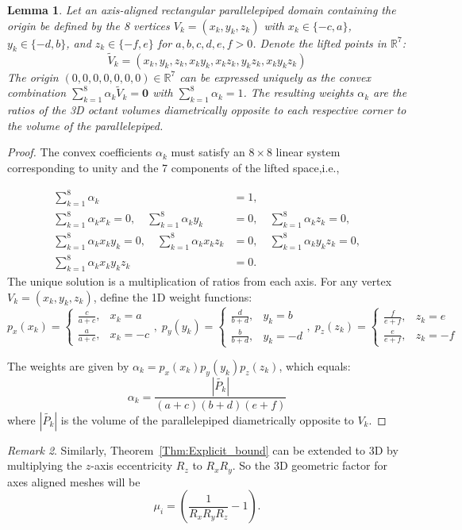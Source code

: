 \documentclass[a4paper]{article}
\theoremstyle{plain}
\newtheorem{lemma}{Lemma}
\theoremstyle{definition}
\theoremstyle{remark}
\newtheorem{remark}[lemma]{Remark}
\begin{document}
\begin{lemma}
	Let an axis-aligned rectangular parallelepiped domain containing the origin be defined by the 8 vertices $V_k = (x_k, y_k, z_k)$ with $x_k \in \{-c, a\}$, $y_k \in \{-d, b\}$, and $z_k \in \{-f, e\}$ for $a,b,c,d,e,f > 0$. Denote the lifted points in $\mathbb{R}^7$:$$\tilde{V}_k = (x_k, y_k, z_k, x_k y_k, x_k z_k, y_k z_k, x_k y_k z_k)$$The origin $(0,0,0,0,0,0,0)\in \mathbb{R}^7$ can be expressed uniquely as the convex combination $\sum_{k=1}^{8} \alpha_k \tilde{V}_k = \mathbf{0}$ with $\sum_{k=1}^{8} \alpha_k = 1$. The resulting weights $\alpha_k$ are the ratios of the 3D octant volumes diametrically opposite to each respective corner to the volume of the parallelepiped.
\end{lemma}

\begin{proof}The convex coefficients $\alpha_k$ must satisfy an $8 \times 8$ linear system corresponding to unity and the 7 components of the lifted space,i.e.,

	    \begin{align}
		\sum_{k=1}^{8} \alpha_k &= 1, \label{eq:unity3d} \\
		\sum_{k=1}^{8} \alpha_k x_k = 0, \quad \sum_{k=1}^{8} \alpha_k y_k &= 0, \quad \sum_{k=1}^{8} \alpha_k z_k = 0, \\
		\sum_{k=1}^{8} \alpha_k x_k y_k = 0, \quad \sum_{k=1}^{8} \alpha_k x_k z_k &= 0, \quad \sum_{k=1}^{8} \alpha_k y_k z_k = 0, \\
		\sum_{k=1}^{8} \alpha_k x_k y_k z_k &= 0.
		\end{align}
	The unique solution is a multiplication of ratios from each axis. For any vertex $V_k = (x_k, y_k, z_k)$, define the 1D weight functions:
	$$p_x(x_k) = \begin{cases} \frac{c}{a+c}, &  x_k = a \\ \frac{a}{a+c}, &  x_k = -c \end{cases}, \; p_y(y_k) = \begin{cases} \frac{d}{b+d}, & y_k = b \\ \frac{b}{b+d}, &  y_k = -d \end{cases},\; p_z(z_k) = \begin{cases} \frac{f}{e+f}, & z_k = e \\ \frac{e}{e+f}, &  z_k = -f \end{cases}$$
	
	The weights are given by $\alpha_k = p_x(x_k) p_y(y_k) p_z(z_k)$, which equals:
	$$\alpha_k = \frac{ |\tilde{P_k}| }{(a+c)(b+d)(e+f)}$$
	where $|\tilde{P_k}|$ is the volume of the parallelepiped diametrically opposite to $V_k$.
\end{proof}
\begin{remark}
	Similarly,  Theorem~\ref{Thm:Explicit_bound} can be extended to 3D by multiplying the $z$-axis eccentricity $R_z$ to $R_x R_y$. So the 3D geometric factor for axes aligned meshes will be 
	\begin{equation}
		\mu_i = \left( \frac{1}{R_x R_y R_z} - 1 \right).
		\label{eq:3DFormula}
	\end{equation}
	\label{Rem:3D}
\end{remark}
\end{document}

